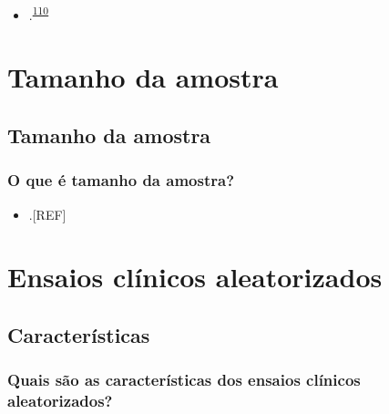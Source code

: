 \documentclass[
]{book}
\providecommand{\tightlist}{%
  \setlength{\itemsep}{0pt}\setlength{\parskip}{0pt}}
\begin{document}
\begin{itemize}
\tightlist
\item
  .\textsuperscript{\protect\hyperlink{ref-findley2021}{110}}
\end{itemize}

\hypertarget{tamanho-amostra}{%
\chapter{\texorpdfstring{\textbf{Tamanho da amostra}}{Tamanho da amostra}}\label{tamanho-amostra}}

\hypertarget{tamanho-amostra}{%
\section{Tamanho da amostra}\label{tamanho-amostra}}

\hypertarget{o-que-uxe9-tamanho-da-amostra}{%
\subsection{O que é tamanho da amostra?}\label{o-que-uxe9-tamanho-da-amostra}}

\begin{itemize}
\tightlist
\item
  .{[}REF{]}
\end{itemize}

\hypertarget{ensaios-cluxednicos-aleatorizados}{%
\chapter{\texorpdfstring{\textbf{Ensaios clínicos aleatorizados}}{Ensaios clínicos aleatorizados}}\label{ensaios-cluxednicos-aleatorizados}}

\hypertarget{caracteristicas}{%
\section{Características}\label{caracteristicas}}

\hypertarget{quais-suxe3o-as-caracteruxedsticas-dos-ensaios-cluxednicos-aleatorizados}{%
\subsection{Quais são as características dos ensaios clínicos aleatorizados?}\label{quais-suxe3o-as-caracteruxedsticas-dos-ensaios-cluxednicos-aleatorizados}}
\end{document}
